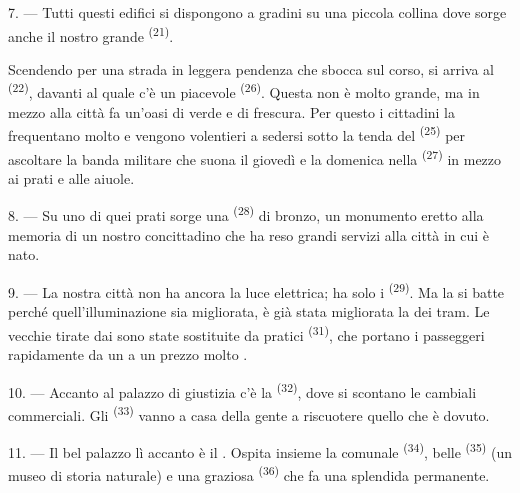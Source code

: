 7. --- Tutti questi edifici si dispongono a gradini su una piccola collina dove sorge
anche il nostro grande  \textsuperscript{(21)}.

Scendendo per una strada in leggera pendenza che sbocca sul corso, si arriva al
 \textsuperscript{(22)}, davanti al quale c'è un piacevole
 \textsuperscript{(26)}. Questa  non è molto grande,
ma in mezzo alla città fa un'oasi di verde e di frescura. Per questo i cittadini la
frequentano molto e vengono volentieri a sedersi sotto la tenda del 
\textsuperscript{(25)} per ascoltare la banda militare che suona il giovedì e la
domenica nella  \textsuperscript{(27)} in mezzo ai prati e alle
aiuole.

8. --- Su uno di quei prati sorge una  \textsuperscript{(28)} di bronzo,
un monumento eretto alla memoria di un nostro concittadino che ha reso grandi servizi
alla città in cui è nato.

\VUsaut{4.0mm}
\VUsaut{3.4mm}

9. --- La nostra città non ha ancora la luce elettrica; ha solo i  \textsuperscript{(29)}. Ma la  si batte perché
quell'illuminazione sia migliorata,  è già stata migliorata la
 dei tram. Le vecchie  tirate dai 
sono state sostituite da pratici  \textsuperscript{(31)}, che
portano i passeggeri rapidamente da un  a un prezzo
molto .

10. --- Accanto al palazzo di giustizia c'è la  \textsuperscript{(32)},
dove si scontano le cambiali commerciali. Gli 
\textsuperscript{(33)} vanno a casa della gente a riscuotere quello che è dovuto.

\VUsaut{4.0mm}
\VUsaut{3.4mm}

11. --- Il bel palazzo lì accanto è il . Ospita insieme la
 comunale \textsuperscript{(34)}, belle  \textsuperscript{(35)} (un museo di storia naturale) e una graziosa
 \textsuperscript{(36)} che fa una splendida 
permanente.

